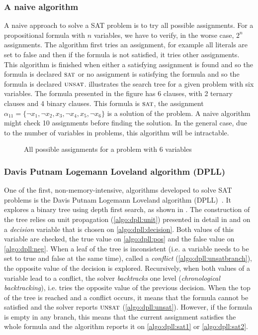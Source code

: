 \subsubsection{A naive algorithm}
A naive approach to solve a SAT problem is to try all possible assignments.
For a propositional formula with $n$ variables, we have to verify, in the worse case, $2^n$ assignments.  
The algorithm first tries an assignment, for example all literals are set to false and then if
the formula is not satisfied, it tries other assignments. 
This algorithm is finished when either a satisfying assignment is found and so
the formula is declared $\textsc{sat}$  or no assignment is satisfying the formula and so the formula is declared $\textsc{unsat}$.
 illustrates the search tree for a given problem with six variables.
The  formula presented in the figure has 6 clauses, with 2 ternary clauses and 4 binary clauses.
This formula is $\textsc{sat}$, the assignment $\alpha_{11} = \{\neg x_1, \neg x_2, x_3, \neg x_4, x_5, \neg x_6 \}$ is a solution of the problem.
A naive algorithm might check 10 assignments before finding the solution. 
In the general case, due to the number of variables in problems, this algorithm will be intractable.


\begin{figure}[!htbp]
 \centering
 
 \caption{All possible assignments for a problem with 6 variables}
 \label{fig:naive_algo}
\end{figure}

\subsubsection{Davis Putnam Logemann Loveland algorithm (DPLL)}\label{sec:dpll}
One of the first, non-memory-intensive, algorithms developed to solve SAT problems is 
the Davis Putnam Logemann Loveland algorithm (DPLL)~\cite{dpll_62}. 
It explores a binary tree using depth first search, as shown in .
The construction of the tree  relies  on unit propagation (\cref{algo:dpll:unit}) presented in detail in  and on a \emph{decision} variable  that is chosen on \cref{algo:dpll:decision}.
Both values of this variable are checked, the true value on \cref{algo:dpll:pos} and the false value on \cref{algo:dpll:neg}.
When a leaf of the tree is inconsistent (i.e. a variable needs to be set to true and false at the same time), called a \textit{conflict} (\cref{algo:dpll:unsatbranch}), the opposite value of the decision is explored.
Recursively, when both values of a variable lead to a conflict,
the solver \emph{backtracks} one level (\emph{chronological backtracking}), i.e. tries the opposite value of 
the previous decision.
When the top of the tree is reached and a conflict occurs, it means that the formula cannot be satisfied and the 
solver reports $\textsc{unsat}$ (\cref{algo:dpll:unsat}). However, if the formula is empty in any branch, 
this means that the current assignment satisfies the whole formula and the algorithm reports it on \cref{algo:dpll:sat1}
or \ref{algo:dpll:sat2}.


